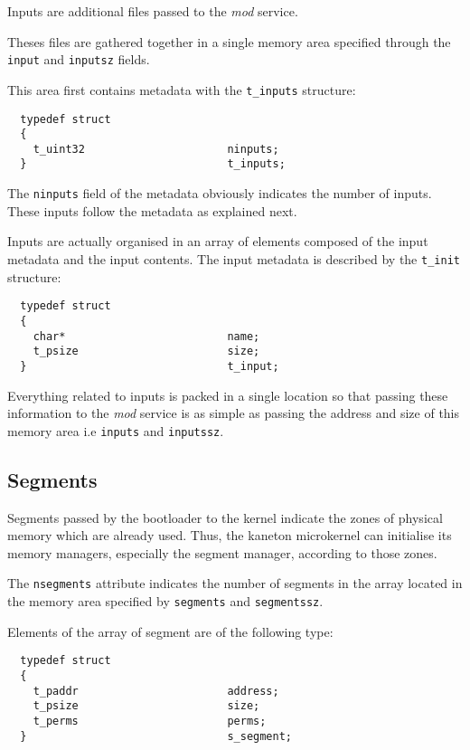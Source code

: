 Inputs are additional files passed to the \textit{mod} service.

Theses files are gathered together in a single memory area specified through
the \texttt{input} and \texttt{inputsz} fields.

This area first contains metadata with the \texttt{t\_inputs} structure:

\begin{verbatim}
  typedef struct
  {
    t_uint32                      ninputs;
  }                               t_inputs;
\end{verbatim}

The \texttt{ninputs} field of the metadata obviously indicates the number
of inputs. These inputs follow the metadata as explained next.

Inputs are actually organised in an array of elements composed of the input
metadata and the input contents. The input metadata is described by the
\texttt{t\_init} structure:

\begin{verbatim}
  typedef struct
  {
    char*                         name;
    t_psize                       size;
  }                               t_input;
\end{verbatim}

Everything related to inputs is packed in a single location so that passing
these information to the \textit{mod} service is as simple as passing the
address and size of this memory area i.e \texttt{inputs} and \texttt{inputssz}.


\subsection*{Segments}

Segments passed by the bootloader to the kernel indicate the zones of
physical memory which are already used. Thus, the kaneton microkernel can
initialise its memory managers, especially the segment manager, according
to those zones.

The \texttt{nsegments} attribute indicates the number of segments in the
array located in the memory area specified by \texttt{segments} and
\texttt{segmentssz}.

Elements of the array of segment are of the following type:

\begin{verbatim}
  typedef struct
  {
    t_paddr                       address;
    t_psize                       size;
    t_perms                       perms;
  }                               s_segment;
\end{verbatim}

